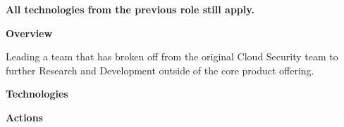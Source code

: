 \documentclass[10pt,a4paper]{altacv}
\begin{document}
\tagline{}


\begin{fullwidth}
\makecvheader
\end{fullwidth}



{\faExclamation}{   \textbf{All technologies from the previous role still apply.}}

\textbf{Overview}

Leading a team that has broken off from the original Cloud Security team to further Research and Development outside of the core product offering.

\divider

\textbf{Technologies}


\divider

\textbf{Actions}
\end{document}
